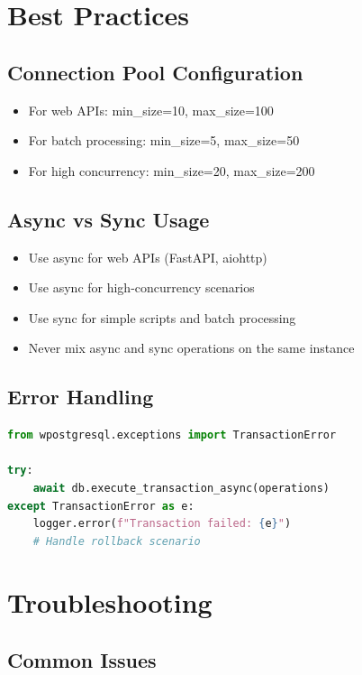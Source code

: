 \documentclass[12pt,a4paper]{report}
\begin{document}
\chapter{Best Practices}

\section{Connection Pool Configuration}

\begin{itemize}
	\item For web APIs: min\_size=10, max\_size=100
	\item For batch processing: min\_size=5, max\_size=50
	\item For high concurrency: min\_size=20, max\_size=200
\end{itemize}

\section{Async vs Sync Usage}

\begin{itemize}
	\item Use async for web APIs (FastAPI, aiohttp)
	\item Use async for high-concurrency scenarios
	\item Use sync for simple scripts and batch processing
	\item Never mix async and sync operations on the same instance
\end{itemize}

\section{Error Handling}

\begin{lstlisting}[language=Python, caption=Error Handling]
from wpostgresql.exceptions import TransactionError

try:
    await db.execute_transaction_async(operations)
except TransactionError as e:
    logger.error(f"Transaction failed: {e}")
    # Handle rollback scenario
\end{lstlisting}

\chapter{Troubleshooting}

\section{Common Issues}
\end{document}
